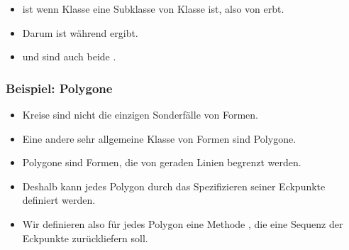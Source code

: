 \documentclass[aspectratio=169,mathserif,notheorems]{beamer}%
\begin{document}
\begin{frame}[t]
{{\begin{itemize}
%
\item<16->  ist  wenn Klasse  eine Subklasse von Klasse  ist, also von  erbt.%
%
\item<17-> Darum ist   während   ergibt.%
%
\item<18->  und  sind auch beide .%
%
\end{itemize}%
}}%
%
%
%
%
\end{frame}%
%

\begin{frame}[t]%
\frametitle{Beispiel: Polygone}%
%
\begin{itemize}%
%
\item Kreise sind nicht die einzigen Sonderfälle von Formen.%
%
\item<2-> Eine andere sehr allgemeine Klasse von Formen sind Polygone.%
%
\item<3-> Polygone sind Formen, die von geraden Linien begrenzt werden.%
%
\item<4-> Deshalb kann jedes Polygon durch das Spezifizieren seiner Eckpunkte definiert werden.%
%
\item<5-> Wir definieren also für jedes Polygon eine Methode , die eine Sequenz der Eckpunkte zurückliefern soll.%
%
\end{itemize}%
%
%
%
\end{frame}%
%
%
\end{document}

